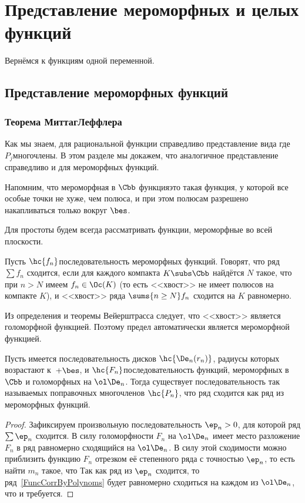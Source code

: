 \documentclass[a4paper]{article}
\begin{document}
\section{Представление мероморфных и целых функций}

Вернёмся к функциям одной переменной.

\subsection{Представление мероморфных функций}

\subsubsection{Теорема Миттаг\д Леффлера}

Как мы знаем, для рациональной функции справедливо представление вида
где $P_j$\т многочлены. В этом разделе мы докажем, что аналогичное представление
справедливо и для мероморфных функций.

Напомним, что мероморфная в $\Cbb$ функция\т это такая функция, у которой все особые точки не хуже,
чем полюса, и при этом полюсам разрешено накапливаться только вокруг $\bes$.

Для простоты будем всегда рассматривать функции, мероморфные во всей плоскости.

\begin{df}
Пусть $\hc{f_n}$\т последовательность мероморфных функций. Говорят, что ряд $\sum f_n$ сходится, если
для каждого компакта $K \subs \Cbb$ найдётся $N$ такое, что при $n > N$ имеем $f_n \in \Oc(K)$ (то есть
<<хвост>> не имеет полюсов на компакте $K$), и <<хвост>> ряда $\sums{n \ge N} f_n$ сходится на $K$ равномерно.
\end{df}

Из определения и теоремы Вейерштрасса следует, что <<хвост>> является голоморфной функцией.
Поэтому предел автоматически является мероморфной функцией.

\begin{lemma}
Пусть имеется последовательность дисков $\hc{\De_n(r_n)}$, радиусы которых возрастают к~$+\bes$,
и $\hc{F_n}$\т последовательность функций, мероморфных в $\Cbb$ и голоморфных на $\ol\De_n$.
Тогда существует последовательность так называемых поправочных многочленов $\hc{P_n}$,
что ряд
сходится как ряд из мероморфных функций.
\end{lemma}
\begin{proof}
Зафиксируем произвольную последовательность $\ep_n > 0$, для которой ряд
$\sum \ep_n$ сходится.
В силу голоморфности $F_n$ на $\ol \De_n$ имеет место разложение $F_n$ в ряд
равномерно сходящийся на $\ol \De_n$. В силу этой сходимости можно приблизить
функцию $F_n$ отрезком её степенного ряда с точностью $\ep_n$, то есть найти $m_n$ такое,
что
Так как ряд из $\ep_n$ сходится, то ряд~\eqref{FuncCorrByPolynoms} будет равномерно сходиться
на каждом из $\ol \De_n$, что и требуется.
\end{proof}
\end{document}
